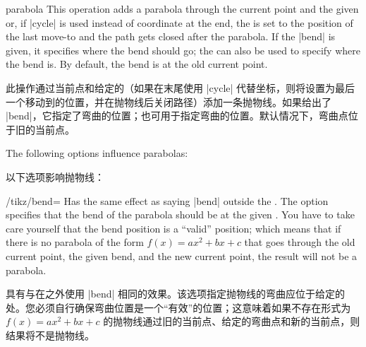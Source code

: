 \begin{pathoperation}{parabola}{}
    This operation adds a parabola through the current point and the given
     or, if |cycle| is used instead of coordinate at the end,
    the  is set to the position of the last move-to and the
    path gets closed after the parabola. If the |bend| is given, it specifies
    where the bend should go; the  can also be used to specify
    where the bend is. By default, the bend is at the old current point.

    此操作通过当前点和给定的（如果在末尾使用 |cycle| 代替坐标，则将设置为最后一个移动到的位置，并在抛物线后关闭路径）添加一条抛物线。如果给出了 |bend|，它指定了弯曲的位置；也可用于指定弯曲的位置。默认情况下，弯曲点位于旧的当前点。
\begin{codeexample}[]
\end{codeexample}

    The following options influence parabolas:

    以下选项影响抛物线：

    \begin{key}{/tikz/bend=}
        Has the same effect as saying |bend| outside the
        . The option specifies that the bend of the parabola
        should be at the given . You have to take care
        yourself that the bend position is a ``valid'' position; which means
        that if there is no parabola of the form $f(x) = a x^2 + b x + c$ that
        goes through the old current point, the given bend, and the new current
        point, the result will not be a parabola.

        具有与在之外使用 |bend| 相同的效果。该选项指定抛物线的弯曲应位于给定的处。您必须自行确保弯曲位置是一个“有效”的位置；这意味着如果不存在形式为 $f(x) = a x^2 + b x + c$ 的抛物线通过旧的当前点、给定的弯曲点和新的当前点，则结果将不是抛物线。



\end{key}
\end{pathoperation}
